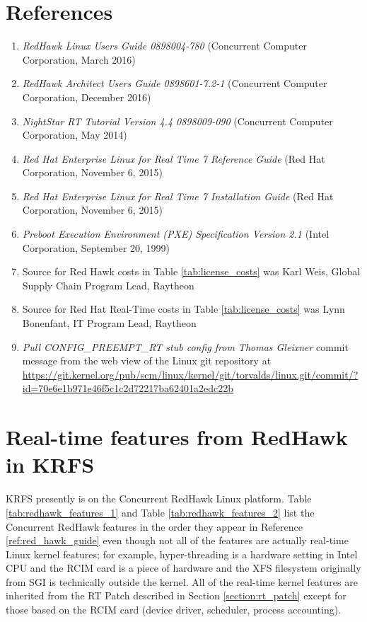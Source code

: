 \documentclass[12pt]{article}
\begin{document}
%
\newpage
\section{References}

\begin{enumerate}
    \item \textit{RedHawk Linux Users Guide 0898004-780} (Concurrent Computer
Corporation, March 2016) \label{ref:red_hawk_guide}
    \item \textit{RedHawk Architect Users Guide 0898601-7.2-1} (Concurrent
Computer Corporation, December 2016) \label{ref:architect}
    \item \textit{NightStar RT Tutorial Version 4.4 0898009-090} (Concurrent
Computer Corporation, May 2014) \label{ref:nightstar}
    \item \textit{Red Hat Enterprise Linux for Real Time 7 Reference Guide} (Red
Hat Corporation, November 6, 2015) \label{ref:rhel7_ref}
    \item \textit{Red Hat Enterprise Linux for Real Time 7 Installation Guide}
(Red Hat Corporation, November 6, 2015) \label{ref:rhel7_install}
    \item \textit{Preboot Execution Environment (PXE) Specification Version 2.1}
(Intel Corporation, September 20, 1999) \label{ref:pxe_boot}
    \item Source for Red Hawk costs in Table \ref{tab:license_costs} was Karl
Weis, Global Supply Chain Program Lead, Raytheon \label{ref:karl}
    \item Source for Red Hat Real-Time costs in Table \ref{tab:license_costs}
was Lynn Bonenfant, IT Program Lead, Raytheon \label{ref:lynn}
    \item \textit{Pull CONFIG\_PREEMPT\_RT stub config from Thomas Gleixner}
commit message from the web view of the Linux git repository at
\url{https://git.kernel.org/pub/scm/linux/kernel/git/torvalds/linux.git/commit/?id=70e6e1b971e46f5c1c2d72217ba62401a2edc22b}
\label{ref:commit}
\end{enumerate}


%
\newpage
\section{Real-time features from RedHawk in KRFS}
\label{sec:redhawk_features}

KRFS presently is on the Concurrent RedHawk Linux platform. Table
\ref{tab:redhawk_features_1} and Table \ref{tab:redhawk_features_2} list the
Concurrent RedHawk features in the order they appear in Reference
\ref{ref:red_hawk_guide} even though not all of the features are actually
real-time Linux kernel features; for example, hyper-threading is a hardware
setting in Intel CPU and the RCIM card is a piece of hardware and the XFS
filesystem originally from SGI is technically outside the kernel.  All of the
real-time kernel features are inherited from the RT Patch described in Section
\ref{section:rt_patch} except for those based on the RCIM card (device driver,
scheduler, process accounting).
\end{document}
